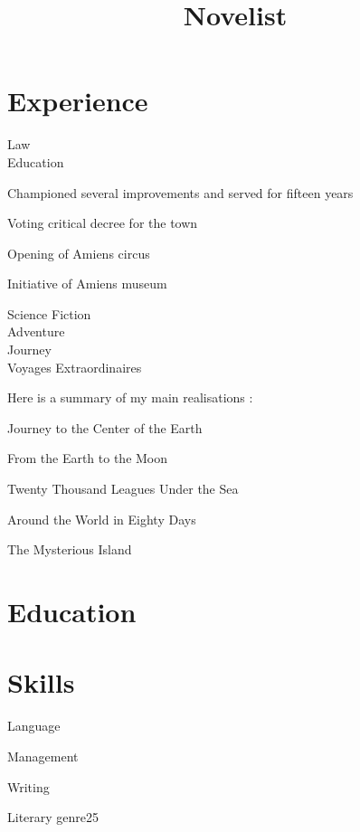\documentclass[a4paper,11pt]{cv4tw}%
\title{Novelist}
\begin{document}
\section{Experience}
{Law\\Education}
	{ Championed several improvements and served for fifteen years
	\begin{missions}
		\item Voting critical decree for the town
		\item Opening of Amiens circus
		\item Initiative of Amiens museum
	\end{missions}
}
	{Science Fiction\\Adventure\\Journey\\Voyages Extraordinaires}
	{Here is a summary of my main realisations :
	\begin{missions}
		\item Journey to the Center of the Earth
		\item From the Earth to the Moon 
		\item Twenty Thousand Leagues Under the Sea
		\item Around the World in Eighty Days
		\item The Mysterious Island
	\end{missions}
}
\section{Education}
\section{Skills}
\begin{skills} {Language}
\end{skills}
\begin{skills}{Management}
\end{skills}
\begin{skills}{Writing}
\end{skills}
\begin{fields}{Literary genre}{2}{5}
\end{fields}
\end{document}
